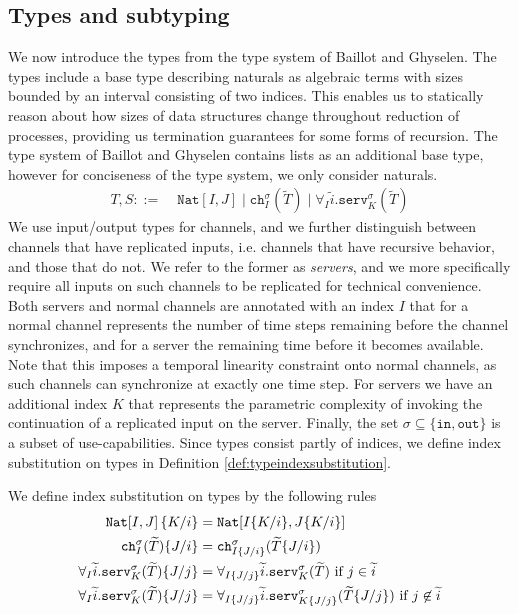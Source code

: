 \subsection{Types and subtyping}\label{sec:typesandsubs}

We now introduce the types from the type system of Baillot and Ghyselen. The types include a base type describing naturals as algebraic terms with sizes bounded by an interval consisting of two indices. This enables us to statically reason about how sizes of data structures change throughout reduction of processes, providing us termination guarantees for some forms of recursion. The type system of Baillot and Ghyselen contains lists as an additional base type, however for conciseness of the type system, we only consider naturals.
%
\begin{align*}
    T,S ::=&\; \texttt{Nat}[I,J] \mid \texttt{ch}_I^\sigma(\widetilde{T}) \mid \forall_I\widetilde{i}.\texttt{serv}_K^\sigma(\widetilde{T})
\end{align*}
%
We use input/output types for channels, and we further distinguish between channels that have replicated inputs, i.e. channels that have recursive behavior, and those that do not. We refer to the former as \textit{servers}, and we more specifically require all inputs on such channels to be replicated for technical convenience. Both servers and normal channels are annotated with an index $I$ that for a normal channel represents the number of time steps remaining before the channel synchronizes, and for a server the remaining time before it becomes available. Note that this imposes a temporal linearity constraint onto normal channels, as such channels can synchronize at exactly one time step. For servers we have an additional index $K$ that represents the parametric complexity of invoking the continuation of a replicated input on the server. Finally, the set $\sigma \subseteq \{\texttt{in},\texttt{out}\}$ is a subset of use-capabilities. Since types consist partly of indices, we define index substitution on types in Definition \ref{def:typeindexsubstitution}.\\

\begin{definition}\label{def:typeindexsubstitution}
    We define index substitution on types by the following rules
    \begin{align*}
        \texttt{Nat}\!\left[I,J\right]\{K/i\} &= \texttt{Nat}\!\left[I\{K/i\},J\{K/i\}\right]\\
        \texttt{ch}^{\sigma}_{I}(\widetilde{T})\{J/i\} &= \texttt{ch}^{\sigma}_{I\{J/i\}}(\widetilde{T}\{J/i\})\\
        \forall_{I} \widetilde{i}.\texttt{serv}^{\sigma}_{K}(\widetilde{T})\{J/j\} &= \forall_{I\{J/j\}} \widetilde{i}.\texttt{serv}^{\sigma}_{K}(\widetilde{T}) \text{ if } j \in \widetilde{i}\\
        \forall_{I} \widetilde{i}.\texttt{serv}^{\sigma}_{K}(\widetilde{T})\{J/j\} &= \forall_{I\{J/j\}} \widetilde{i}.\texttt{serv}^{\sigma}_{K\{J/j\}}(\widetilde{T}\{J/j\}) \text{ if } j \not\in \widetilde{i}
    \end{align*}
\end{definition}


